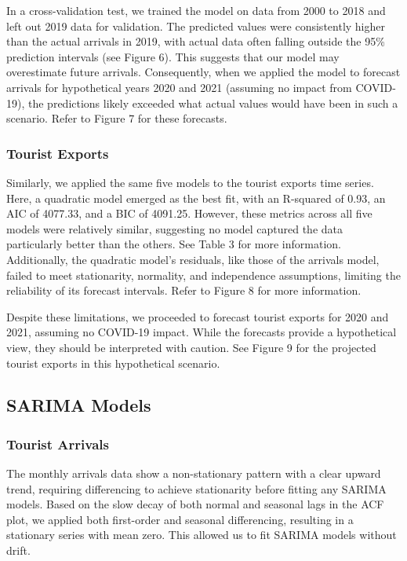 \documentclass[11pt]{article}
\begin{document}
In a cross-validation test, we trained the model on data from 2000 to 2018 and left out 2019 data for validation. The predicted values were consistently higher than the actual arrivals in 2019, with actual data often falling outside the 95\% prediction intervals (see Figure 6). This suggests that our model may overestimate future arrivals. Consequently, when we applied the model to forecast arrivals for hypothetical years 2020 and 2021 (assuming no impact from COVID-19), the predictions likely exceeded what actual values would have been in such a scenario. Refer to Figure 7 for these forecasts.

\subsubsection{Tourist Exports}

Similarly, we applied the same five models to the tourist exports time series. Here, a quadratic model emerged as the best fit, with an R-squared of 0.93, an AIC of 4077.33, and a BIC of 4091.25. However, these metrics across all five models were relatively similar, suggesting no model captured the data particularly better than the others. See Table 3 for more information. Additionally, the quadratic model's residuals, like those of the arrivals model, failed to meet stationarity, normality, and independence assumptions, limiting the reliability of its forecast intervals. Refer to Figure 8 for more information.

Despite these limitations, we proceeded to forecast tourist exports for 2020 and 2021, assuming no COVID-19 impact. While the forecasts provide a hypothetical view, they should be interpreted with caution. See Figure 9 for the projected tourist exports in this hypothetical scenario.

\subsection{SARIMA Models}

\subsubsection{Tourist Arrivals}

The monthly arrivals data show a non-stationary pattern with a clear upward trend, requiring differencing to achieve stationarity before fitting any SARIMA models. Based on the slow decay of both normal and seasonal lags in the ACF plot, we applied both first-order and seasonal differencing, resulting in a stationary series with mean zero. This allowed us to fit SARIMA models without drift.
\end{document}

